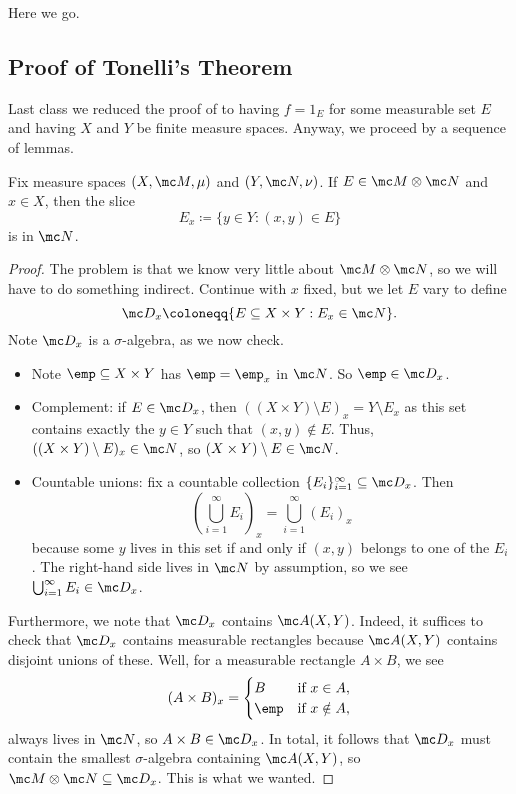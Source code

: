 \documentclass[../notes.tex]{subfiles}
\begin{document}
Here we go.

\subsection{Proof of Tonelli's Theorem}
Last class we reduced the proof of  to having $f=1_E$ for some measurable set $E$ and having $X$ and $Y$ be finite measure spaces. Anyway, we proceed by a sequence of lemmas.
\begin{lemma}
	Fix measure spaces $(X,\mc M,\mu)$ and $(Y,\mc N,\nu)$. If $E\in\mc M\otimes\mc N$ and $x\in X$, then the slice
	\[E_x\coloneqq\{y\in Y:(x,y)\in E\}\]
	is in $\mc N$.
\end{lemma}
\begin{proof}
	The problem is that we know very little about $\mc M\otimes\mc N$, so we will have to do something indirect. Continue with $x$ fixed, but we let $E$ vary to define
	\[\mc D_x\coloneqq\{E\subseteq X\times Y:E_x\in\mc N\}.\]
	Note $\mc D_x$ is a $\sigma$-algebra, as we now check.
	\begin{itemize}
		\item Note $\emp\subseteq X\times Y$ has $\emp=\emp_x$ in $\mc N$. So $\emp\in\mc D_x$.
		\item Complement: if $E\in\mc D_x$, then $((X\times Y)\setminus E)_x=Y\setminus E_x$ as this set contains exactly the $y\in Y$ such that $(x,y)\notin E$. Thus, $((X\times Y)\setminus E)_x\in\mc N$, so $(X\times Y)\setminus E\in\mc N$.
		\item Countable unions: fix a countable collection $\{E_i\}_{i=1}^\infty\subseteq\mc D_x$. Then
		\[\left(\bigcup_{i=1}^\infty E_i\right)_x=\bigcup_{i=1}^\infty(E_i)_x\]
		because some $y$ lives in this set if and only if $(x,y)$ belongs to one of the $E_i$. The right-hand side lives in $\mc N$ by assumption, so we see $\bigcup_{i=1}^\infty E_i\in\mc D_x$.
	\end{itemize}
	Furthermore, we note that $\mc D_x$ contains $\mc A(X,Y)$. Indeed, it suffices to check that $\mc D_x$ contains measurable rectangles because $\mc A(X,Y)$ contains disjoint unions of these. Well, for a measurable rectangle $A\times B$, we see
	\begin{equation}
		(A\times B)_x=\begin{cases}
			B & \text{if }x\in A, \\
			\emp & \text{if }x\notin A,
		\end{cases} \label{eq:measure-slice-rectangle}
	\end{equation}
	always lives in $\mc N$, so $A\times B\in\mc D_x$. In total, it follows that $\mc D_x$ must contain the smallest $\sigma$-algebra containing $\mc A(X,Y)$, so $\mc M\otimes\mc N\subseteq\mc D_x$. This is what we wanted.
\end{proof}
\end{document}
